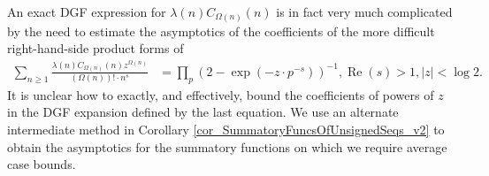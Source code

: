 \documentclass[11pt,reqno,a4letter]{article}
\numberwithin{figure}{section}
\numberwithin{table}{section}
\theoremstyle{plain}
\numberwithin{theorem}{section}
\theoremstyle{definition}
\renewcommand{\Re}{\operatorname{Re}}
\begin{document}
An exact DGF expression for 
$\lambda(n) C_{\Omega(n)}(n)$ is in fact very much complicated by the need to estimate the asymptotics 
of the coefficients of the more difficult right-hand-side product forms of 
\begin{align*} 
\sum_{n \geq 1} \frac{\lambda(n) C_{\Omega(n)}(n) z^{\Omega(n)}}{(\Omega(n))! \cdot n^s} & = 
     \prod_p \left(2 - \exp\left(-z \cdot p^{-s}\right)\right)^{-1}, 
     \Re(s) > 1, |z| < \log 2. 
\end{align*} 
It is unclear how to exactly, and effectively, bound the 
coefficients of powers of $z$ in the DGF expansion defined by the last equation. 
We use an alternate intermediate method in 
Corollary \ref{cor_SummatoryFuncsOfUnsignedSeqs_v2} 
to obtain the asymptotics for the 
summatory functions on which we require average case bounds. 
\end{document}
